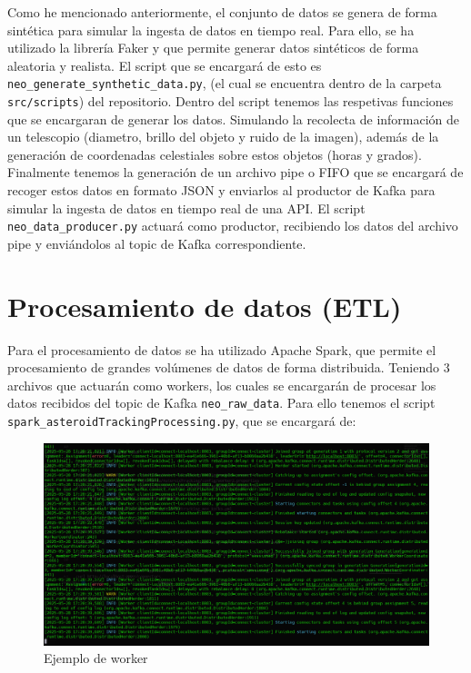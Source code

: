\documentclass[12pt]{article}
\begin{document}
Como he mencionado anteriormente, el conjunto de datos se genera de forma sintética para simular la ingesta de datos en tiempo real.
Para ello, se ha utilizado la librería Faker \cite[Faker]{joke2k-faker} y \cite[numpy]{numpy} que permite generar datos sintéticos 
de forma aleatoria y realista. El script que se encargará de esto es \texttt{neo\_generate\_synthetic\_data.py}, (el cual se
encuentra dentro de la carpeta \texttt{src/scripts}) del repositorio. Dentro del script tenemos las respetivas funciones
que se encargaran de generar los datos. Simulando la recolecta de información de un telescopio (diametro, brillo del objeto y 
ruido de la imagen), además de la generación de coordenadas celestiales sobre estos objetos (horas y grados).
\\
Finalmente tenemos la generación de un archivo pipe o FIFO que se encargará de recoger estos datos en formato JSON y enviarlos 
al productor de Kafka para simular la ingesta de datos en tiempo real de una API. El script \texttt{neo\_data\_producer.py} 
actuará como productor, recibiendo los datos del archivo pipe y enviándolos al topic de Kafka correspondiente.

\section{Procesamiento de datos (ETL)}

Para el procesamiento de datos se ha utilizado Apache Spark, que permite el procesamiento de grandes volúmenes de datos de 
forma distribuida. Teniendo 3 archivos que actuarán como workers, los cuales se encargarán de procesar los datos
recibidos del topic de Kafka \texttt{neo\_raw\_data}. Para ello tenemos el script \texttt{spark\_asteroidTrackingProcessing.py}, que se
encargará de:

\begin{figure}[h!]
    \centering
    \includegraphics[width=.7\textwidth]{assets/proyecto/worker1.PNG}
    \caption{Ejemplo de worker}
    \label{fig:my_label}
\end{figure}
\end{document}
